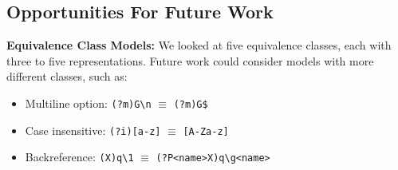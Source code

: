 %
%

\subsection{Opportunities For Future Work}
\label{sec:futureequivclasses}
%
\noindent \textbf{Equivalence Class Models:}
We looked at five equivalence classes, each with three to five representations.
Future work could consider models with more different classes, such as:
%
\begin{itemize}[leftmargin=8pt] %
\item Multiline option: { \verb!(?m)G\n! $\equiv$ \verb!(?m)G$!}
\item Case insensitive: { \verb!(?i)[a-z]! $\equiv$ \verb![A-Za-z]!}
\item Backreference: { \verb!(X)q\1! $\equiv$ \verb!(?P<name>X)q\g<name>!}
\end{itemize}

